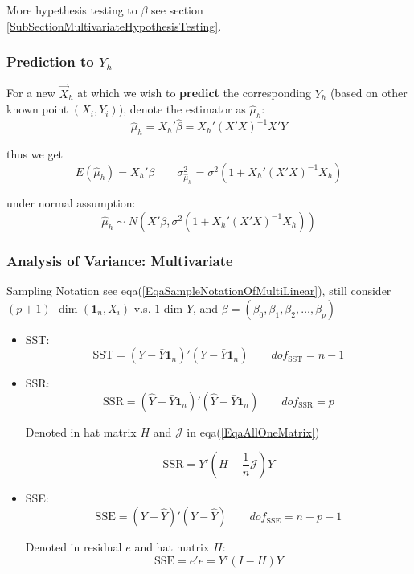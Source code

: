 \noindent More hypethesis testing to $ \beta  $ see section \ref{SubSectionMultivariateHypothesisTesting}.



\subsubsection{Prediction to $ Y_h $}
    For a new $ \vec{X}_h $ at which we wish to \textbf{predict }the corresponding $ Y_h $ (based on other known point $ (X_i,Y_i) $), denote the estimator as $ \hat{\mu}_h $:
    \[
        \hat{\mu }_h=X_h'\hat{\beta }=X_h'(X'X)^{-1}X'Y
    \]
    
    thus we get 
    \[
        E(\hat{\mu }_h)= X_h'\beta  \qquad \sigma ^2_{\hat{\mu}_h}=\sigma ^2(1+X_h'(X'X)^{-1}X_h)
    \]

    under normal assumption:
    \[
        \hat{\mu}_h\sim N(X'\beta,\sigma ^2(1+X_h'(X'X)^{-1}X_h))
    \]
    
    
    
    
    

    

\subsubsection{Analysis of Variance: Multivariate}
    Sampling Notation see eqa(\ref{EqaSampleNotationOfMultiLinear}), still consider $ (p+1) $ -dim $ (\mathbf{1}_n,X_i) $ v.s. $ 1 $-dim $ Y $, and $ \beta=(\beta _0,\beta _1,\beta _2,\ldots,\beta _p) $

\begin{itemize}[topsep=2pt,itemsep=2pt]
    \item SST:
    \begin{equation}
        \mathrm{SST}=(Y-\bar{Y}\mathbf{1}_n)'(Y-\bar{Y}\mathbf{1}_n)\qquad dof_{\mathrm{SST}}=n-1
    \end{equation}
    \item SSR:
    \begin{equation}
         \mathrm{SSR}=(\hat{Y}-\bar{Y}\mathbf{1}_n)'(\hat{Y}-\bar{Y}\mathbf{1}_n)\qquad dof_{\mathrm{SSR}}=p
    \end{equation}

    Denoted in hat matrix $ H $ and $ \mathcal{J} $ in eqa(\ref{EqaAllOneMatrix})
    
    \begin{equation}\label{EqaSSMInMatrixNotation}
        \mathrm{SSR}=Y'(H-\dfrac{1}{n}\mathcal{J})Y 
    \end{equation}
    
    
    \item SSE:
    \begin{equation}
         \mathrm{SSE}=(Y-\hat{Y})'(Y-\hat{Y})\qquad dof_\mathrm{SSE}=n-p-1
    \end{equation}

    Denoted in residual $ e $ and hat matrix $ H $:
    \begin{equation}
        \mathrm{SSE}=e'e=Y'(I-H)Y 
    \end{equation}
    
    
    
\end{itemize}

